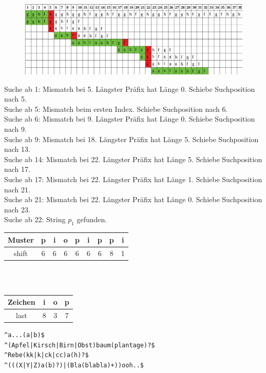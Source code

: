 \documentclass[12pt]{scrartcl}
\begin{document}
\begin{figure}[h!]
\begin{center}
\includegraphics[scale=0.5]{Knutt-Morris-Pratt-Verlauf.png}
\end{center}
\end{figure}
Suche ab 1: Mismatch bei 5. Längster Präfix hat Länge 0. Schiebe Suchposition nach 5.\\
Suche ab 5: Mismatch beim ersten Index. Schiebe Suchposition nach 6.\\
Suche ab 6: Mismatch bei 9. Längster Präfix hat Länge 0. Schiebe Suchposition nach 9.\\
Suche ab 9: Mismatch bei 18. Längster Präfix hat Länge 5. Schiebe Suchposition nach 13.\\
Suche ab 14: Mismatch bei 22. Längster Präfix hat Länge 5. Schiebe Suchposition nach 17.\\
Suche ab 17: Mismatch bei 22. Längster Präfix hat Länge 1. Schiebe Suchposition nach 21.\\
Suche ab 21: Mismatch bei 22. Längster Präfix hat Länge 0. Schiebe Suchposition nach 23.\\
Suche ab 22: String $p_1$ gefunden.

\exercise{}
\begin{tabular}{|c|c|c|c|c|c|c|c|c|}
\hline
Muster & p & i & o & p & i & p & p & i\\
\hline
shift & 6 & 6 & 6 & 6 & 6 & 6 & 8 & 1\\
\hline  
\end{tabular}
\\\\

\begin{tabular}{|c|c|c|c|}
\hline
Zeichen & i & o & p\\
\hline
last & 8 & 3 & 7\\
\hline
\end{tabular}


\exercise{}
\begin{lstlisting}
^a...(a|b)$
^(Apfel|Kirsch|Birn|Obst)baum(plantage)?$
^Rebe(kk|k|ck|cc)a(h)?$
^(((X|Y|Z)a(b)?)|(Bla(blabla)+))ooh..$
\end{lstlisting}



\end{document}
